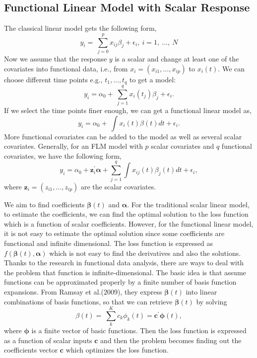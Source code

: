 \subsection{Functional Linear Model with Scalar Response}
The classical linear model gets the following form,
$$y_i=\ \sum_{j=0}^{p}{x_{ij}\beta_j}+\epsilon_i,\ i=1,\ \ldots,\ N$$
Now we assume that the response $y$ is a scalar and change at least one of the covariates into functional data, i.e., from $x_{i} =(x_{i1},\dots,x_{ip})$ to $x_i(t)$. We can choose different time points e.g., $t_{1},\dots ,t_{q}$ to get a model:
$$y_i=\alpha_0+\ \sum_{j=1}^{q}{x_i\left(t_j\right)\beta_j}+\epsilon_i.$$
If we select the time points finer enough, we can get a functional linear model as,
$$y_i=\alpha_0+\ \int{x_i\left(t\right)\beta\left(t\right)dt}+\epsilon_i.$$
More functional covariates can be added to the model as well as several scalar covariates. Generally, for an FLM model with $p$ scalar covariates and $q$ functional covariates, we have the following form,
$$y_i=\alpha_0+\bm{z}_{i}^\prime\bm{\alpha}+ \sum_{j=1}^{q}\int{x_{ij}\left(t\right)\beta_j\left(t\right)dt}+\epsilon_i,$$
where $\bm z_{i} = (z_{i1},\dots ,z_{ip})$ are the scalar covariates.

We aim to find coefficients $\bm \beta(t)$ and $\bm \alpha$. For the traditional scalar linear model, to estimate the coefficients, we can find the optimal solution to the loss function which is a function of scalar coefficients. However, for the functional linear model, it is not easy to estimate the optimal solution since some coefficients are functional and infinite dimensional. The loss function is expressed as $f(\bm\beta(t),\bm\alpha)$ which is not easy to find the derivatives and also the solutions. Thanks to the research in functional data analysis, there are ways to deal with the problem that function is infinite-dimensional. The basic idea is that assume functions can be approximated properly by a finite number of basis function expansions. From Ramsay et al.(2009), they express $\bm \beta(t)$ into linear combinations of basis functions, so that we can retrieve $\bm \beta(t)$ by solving
$$\beta\left(t\right)=\ \sum_{k}^{K}{c_k\phi_k\left(t\right)}=\bm{c}^\prime\bm{\phi}\left(t\right),$$
where $\bm\phi$ is a finite vector of basic functions. Then the loss function is expressed as a function of scalar inputs $\bm c$ and then the problem becomes finding out the coefficients vector $\bm c$ which optimizes the loss function.

